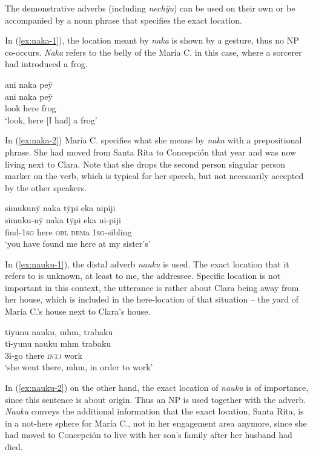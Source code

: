The demonstrative adverbs (including \textit{nechÿu}) can be used on their own or be accompanied by a noun phrase that specifies the exact location.

In (\ref{ex:naka-1}), the location meant by \textit{naka} is shown by a gesture, thus no NP co-occurs. \textit{Naka} refers to the belly of the María C. in this case, where a sorcerer had introduced a frog.

\ea\label{ex:naka-1}
\begingl
\glpreamble ani naka peÿ\\
\gla ani naka peÿ\\
\glb look here frog\\
\glft ‘look, here [I had] a frog’
\endgl
\trailingcitation{[ump-p110815sf.300]}
\xe

In (\ref{ex:naka-2}) María C. specifies what she means by \textit{naka} with a prepositional phrase. She had moved from Santa Rita to Concepción that year and was now living next to Clara. Note that she drops the second person singular person marker on the verb, which is typical for her speech, but not necessarily accepted by the other speakers.


\ea\label{ex:naka-2}
\begingl
\glpreamble simukunÿ naka tÿpi eka nipiji\\
\gla simuku-nÿ naka tÿpi eka ni-piji\\
\glb find-1\textsc{sg} here \textsc{obl} \textsc{dem}a 1\textsc{sg}-sibling\\
\glft ‘you have found me here at my sister’s’
\endgl
\trailingcitation{[cux-120410ls.007]}
\xe

In (\ref{ex:nauku-1}), the distal adverb \textit{nauku} is used. The exact location that it refers to is unknown, at least to me, the addressee. Specific location is not important in this context, the utterance is rather about Clara being away from her house, which is included in the here-location of that situation – the yard of María C.’s house next to Clara’s house.

\ea\label{ex:nauku-1}
\begingl
\glpreamble tiyunu nauku, mhm, trabaku\\
\gla ti-yunu nauku mhm trabaku\\
\glb 3i-go there \textsc{intj} work\\
\glft ‘she went there, mhm, in order to work’
\endgl
\trailingcitation{[uxx-e120427l.089]}
\xe

In (\ref{ex:nauku-2}) on the other hand, the exact location of \textit{nauku} is of importance, since this sentence is about origin. Thus an NP is used together with the adverb. \textit{Nauku} conveys the additional information that the exact location, Santa Rita, is in a not-here sphere for María C., not in her engagement area anymore, since she had moved to Concepción to live with her son’s family after her husband had died.


